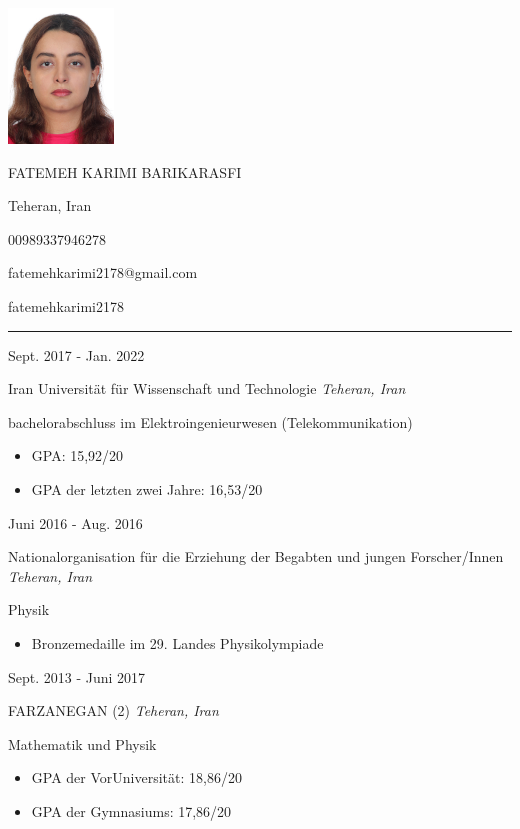 \documentclass[a4paper,10pt]{article}
\newlength{\cvcolumngapwidth}
\newlength{\cvleftcolumnwidth}
\newlength{\cvrightcolumnwidth}
\newcommand{\cvnamestyle}[1]{{\Large\cvnamefont\textcolor{cvnamecolor}{#1}}}
\newcommand{\cvsectionstyle}[1]{{\normalsize\cvsectionfont\textcolor{cvsectioncolor}{#1}}}
\newcommand{\cvtitlestyle}[1]{{\large\cvtitlefont\textcolor{cvtitlecolor}{#1}}}
\newcommand{\cvdurationstyle}[1]{{\small\cvdurationfont\textcolor{cvdurationcolor}{#1}}}
\newlength{\cvafteritemskipamount}
\newlength{\cvaftersectionskipamount}
\newlength{\cvafternameskipamount}
\newlength{\cvafterpersonalinfolineskipamount}
\newlength{\cvaftertitleskipamount}
\newlength{\cvparskip}
\newcommand{\cvpersonalinfo}[2]{
    \begin{minipage}[t]{\cvleftcolumnwidth}
        \vspace{0mm} %
        \raggedleft #1
    \end{minipage}%
    \hspace{\cvcolumngapwidth}%
    \begin{minipage}[t]{\cvrightcolumnwidth}
        \vspace{0mm} %
        #2
    \end{minipage}

    \vspace{\cvafteritemskipamount}
}
\newcommand{\cvname}[1]{
    \cvnamestyle{#1}

    \vspace{\cvafternameskipamount}
}
\newcommand{\cvpersonalinfolinewithicon}[3]{
    \raisebox{.5\fontcharht\font`E-.5\height}{\texttt{[image: \#2]}}
    #3

    \vspace{\cvafterpersonalinfolineskipamount}
}
\newcommand{\cvsection}[1]{
    \begin{minipage}[t]{\cvleftcolumnwidth}
        \raggedleft\cvsectionstyle{#1}
    \end{minipage}%
    \hspace{\cvcolumngapwidth}%
    \begin{minipage}[t]{\cvrightcolumnwidth}
        \textcolor{cvrulecolor}{\rule{\cvrightcolumnwidth}{0.3mm}}
    \end{minipage}

    \vspace{\cvaftersectionskipamount}
}
\newcommand{\cvitem}[2]{
    \begin{minipage}[t]{\cvleftcolumnwidth}
        \raggedleft #1
    \end{minipage}%
    \hspace{\cvcolumngapwidth}%
    \begin{minipage}[t]{\cvrightcolumnwidth}
        \setlength{\parskip}{\cvparskip} #2
    \end{minipage}

    \vspace{\cvafteritemskipamount}
}
\newcommand{\cvtitle}[1]{
    \cvtitlestyle{#1}

    \vspace{\cvaftertitleskipamount}
    \vspace{-\cvparskip}
}
\begin{document}

\cvpersonalinfo{
    \includegraphics[height=36mm]{PassportPhoto.jpg}
}{
    \cvname{FATEMEH KARIMI BARIKARASFI}

    \cvpersonalinfolinewithicon{height=4mm}{072-location.pdf}{
        Teheran, Iran
    }

    \cvpersonalinfolinewithicon{height=4mm}{067-phone.pdf}{
        00989337946278
    }

    \cvpersonalinfolinewithicon{height=4mm}{070-envelop.pdf}{
        fatemehkarimi2178@gmail.com
    }

    \cvpersonalinfolinewithicon{height=4mm}{458-linkedin.pdf}{
        fatemehkarimi2178
    }

}

\cvsection{AUSBILDUNG}
\cvitem{
    \cvdurationstyle{Sept. 2017 - Jan. 2022}
}{
    \cvtitle{{Iran Universität für Wissenschaft und Technologie} \hfill{\textnormal{\textit{Teheran, Iran}}}}
    bachelorabschluss im Elektroingenieurwesen (Telekommunikation)
    \begin{itemize}[leftmargin=*]
        \item GPA: 15,92/20
        \item GPA der letzten zwei Jahre: 16,53/20
    \end{itemize}
}

\cvitem{
    \cvdurationstyle{Juni 2016 - Aug. 2016}
}{
    \cvtitle{{Nationalorganisation für die Erziehung der Begabten und jungen Forscher/Innen} \hfill{\textnormal{\textit{Teheran, Iran}}}}
    Physik
    \begin{itemize}[leftmargin=*]
        \item Bronzemedaille im 29. Landes Physikolympiade
    \end{itemize}
}

\cvitem{
    \cvdurationstyle{Sept. 2013 - Juni 2017}
}{
    \cvtitle{{FARZANEGAN (2)} \hfill{\textnormal{\textit{Teheran, Iran}}}}
    Mathematik und Physik
    \begin{itemize}[leftmargin=*]
        \item GPA der VorUniversität: 18,86/20
        \item GPA der Gymnasiums: 17,86/20
    \end{itemize}
}
\end{document}
